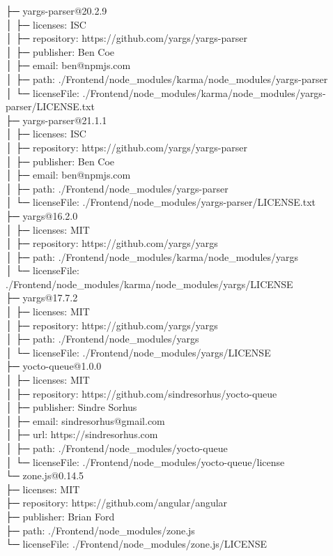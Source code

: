 ├─ yargs-parser@20.2.9\\
│  ├─ licenses: ISC\\
│  ├─ repository: https://github.com/yargs/yargs-parser\\
│  ├─ publisher: Ben Coe\\
│  ├─ email: ben@npmjs.com\\
│  ├─ path: ./Frontend/node\_modules/karma/node\_modules/yargs-parser\\
│  └─ licenseFile: ./Frontend/node\_modules/karma/node\_modules/yargs-parser/LICENSE.txt\\
├─ yargs-parser@21.1.1\\
│  ├─ licenses: ISC\\
│  ├─ repository: https://github.com/yargs/yargs-parser\\
│  ├─ publisher: Ben Coe\\
│  ├─ email: ben@npmjs.com\\
│  ├─ path: ./Frontend/node\_modules/yargs-parser\\
│  └─ licenseFile: ./Frontend/node\_modules/yargs-parser/LICENSE.txt\\
├─ yargs@16.2.0\\
│  ├─ licenses: MIT\\
│  ├─ repository: https://github.com/yargs/yargs\\
│  ├─ path: ./Frontend/node\_modules/karma/node\_modules/yargs\\
│  └─ licenseFile: ./Frontend/node\_modules/karma/node\_modules/yargs/LICENSE\\
├─ yargs@17.7.2\\
│  ├─ licenses: MIT\\
│  ├─ repository: https://github.com/yargs/yargs\\
│  ├─ path: ./Frontend/node\_modules/yargs\\
│  └─ licenseFile: ./Frontend/node\_modules/yargs/LICENSE\\
├─ yocto-queue@1.0.0\\
│  ├─ licenses: MIT\\
│  ├─ repository: https://github.com/sindresorhus/yocto-queue\\
│  ├─ publisher: Sindre Sorhus\\
│  ├─ email: sindresorhus@gmail.com\\
│  ├─ url: https://sindresorhus.com\\
│  ├─ path: ./Frontend/node\_modules/yocto-queue\\
│  └─ licenseFile: ./Frontend/node\_modules/yocto-queue/license\\
└─ zone.js@0.14.5\\
├─ licenses: MIT\\
├─ repository: https://github.com/angular/angular\\
├─ publisher: Brian Ford\\
├─ path: ./Frontend/node\_modules/zone.js\\
└─ licenseFile: ./Frontend/node\_modules/zone.js/LICENSE\\